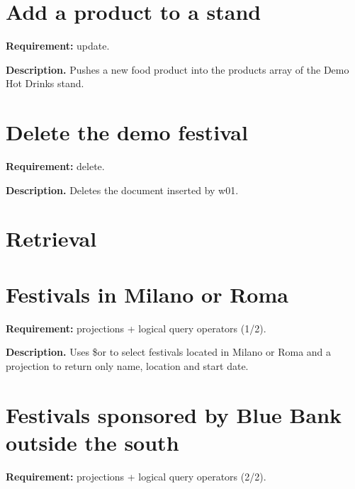 \section{Add a product to a stand}
\textbf{Requirement:} update.

\textbf{Description.} Pushes a new food product into the products array of the Demo Hot Drinks stand. 



\section{Delete the demo festival}
\textbf{Requirement:} delete.

\textbf{Description.} Deletes the document inserted by w01. 



\section*{Retrieval}
\section{Festivals in Milano or Roma}
\textbf{Requirement:} projections + logical query operators (1/2).

\textbf{Description.} Uses \$or to select festivals located in Milano or Roma and a projection to return only name, location and start date. 



\section{Festivals sponsored by Blue Bank outside the south}
\textbf{Requirement:} projections + logical query operators (2/2).

